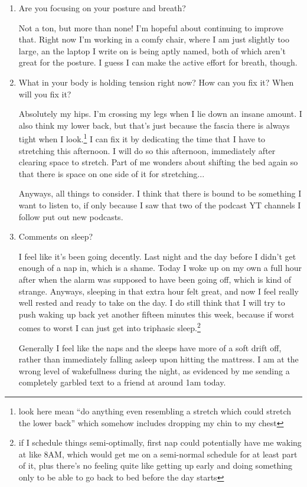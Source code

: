 \documentclass[12pt]{article}
\newcommand{\say}[1]{``#1''}
\renewcommand{\,}{\textsuperscript{,}}
\begin{document}
\begin{enumerate}
\item Are you focusing on your posture and breath?

Not a ton, but more than none! I'm hopeful about continuing to improve that. Right now I'm working in a comfy chair, where I am just slightly too large, an the laptop I write on is being aptly named, both of which aren't great for the posture.  
I guess I can make the active effort for breath, though.

\item What in your body is holding tension right now? How can you fix it? When will you fix it?

Absolutely my hips. I'm crossing my legs when I lie down an insane amount. I also think my lower back, but that's just because the fascia there is always tight when I look.\footnote{look here mean \say{do anything even resembling a stretch which could stretch the lower back} which somehow includes dropping my chin to my chest}  
I can fix it by dedicating the time that I have to stretching this afternoon.  
I will do so this afternoon, immediately after clearing space to stretch. Part of me wonders about shifting the bed again so that there is space on one side of it for stretching...

Anyways, all things to consider. I think that there is bound to be something I want to listen to, if only because I saw that two of the podcast YT channels I follow put out new podcasts.

\item Comments on sleep?

I feel like it's been going decently. Last night and the day before I didn't get enough of a nap in, which is a shame.  
Today I woke up on my own a full hour after when the alarm was supposed to have been going off, which is kind of strange.  
Anyways, sleeping in that extra hour felt great, and now I feel really well rested and ready to take on the day.  
I do still think that I will try to push waking up back yet another fifteen minutes this week, because if worst comes to worst I can just get into triphasic sleep.\footnote{if I schedule things semi-optimally, first nap could potentially have me waking at like 8AM, which would get me on a semi-normal schedule for at least part of it, plus there's no feeling quite like getting up early and doing something only to be able to go back to bed before the day starts}

Generally I feel like the naps and the sleeps have more of a soft drift off, rather than immediately falling asleep upon hitting the mattress.  
I am at the wrong level of wakefullness during the night, as evidenced by me sending a completely garbled text to a friend at around 1am today.


\end{enumerate}
\end{document}
